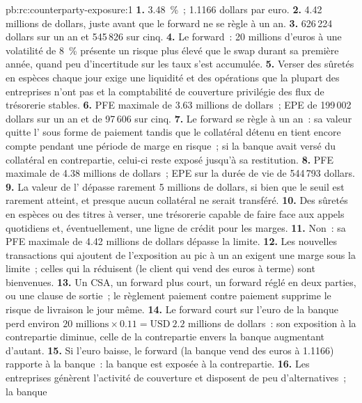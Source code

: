 \begin{solution}{pb:rc:counterparty-exposure:1}
\textbf{1.} 3.48~\%~; 1.1166 dollars par euro.
\textbf{2.} 4.42 millions de dollars, juste avant que le forward ne se règle à un an.
\textbf{3.} 626\,224 dollars sur un an et 545\,826 sur cinq.
\textbf{4.} Le forward~: 20 millions d'euros à une volatilité de 8~\% présente un risque plus élevé que le swap
durant sa première année, quand peu d'incertitude sur les taux s'est accumulée.
\textbf{5.} Verser des sûretés en espèces chaque jour exige une liquidité et des opérations que la plupart des entreprises n'ont pas
et la comptabilité de couverture privilégie des flux de trésorerie stables.
\textbf{6.} PFE maximale de 3.63 millions de dollars~; EPE de 199\,002 dollars sur un an et de 97\,606 sur cinq.
\textbf{7.} Le forward se règle à un an~: sa valeur quitte l' sous forme de paiement
tandis que le collatéral détenu en tient encore compte pendant une période de marge en risque~; si la banque avait
versé du collatéral en contrepartie, celui-ci reste exposé jusqu'à sa restitution.
\textbf{8.} PFE maximale de 4.38 millions de dollars~; EPE sur la durée de vie de 544\,793 dollars.
\textbf{9.} La valeur de l' dépasse rarement 5 millions de dollars, si bien que le seuil
est rarement atteint, et presque aucun collatéral ne serait transféré.
\textbf{10.} Des sûretés en espèces ou des titres à verser, une trésorerie capable de faire face aux appels quotidiens et, éventuellement, une
ligne de crédit pour les marges.
\textbf{11.} Non~: sa PFE maximale de 4.42 millions de dollars dépasse la limite.
\textbf{12.} Les nouvelles transactions qui ajoutent de l'exposition au pic à un an exigent une marge sous la limite~; celles
qui la réduisent (le client qui vend des euros à terme) sont bienvenues.
\textbf{13.} Un CSA, un forward plus court, un forward réglé en deux parties, ou une clause de sortie~;
le règlement paiement contre paiement supprime le risque de livraison le jour même.
\textbf{14.} Le forward court sur l'euro de la banque perd environ $20\text{ millions}\times0.11 = \text{USD}~2.2$
millions de dollars~: son exposition à la contrepartie diminue, celle de la contrepartie envers la banque augmentant d'autant.
\textbf{15.} Si l'euro baisse, le forward (la banque vend des euros à 1.1166) rapporte à la banque~: la
banque est exposée à la contrepartie.
\textbf{16.} Les entreprises génèrent l'activité de couverture et disposent de peu d'alternatives~; la banque

\end{solution}
